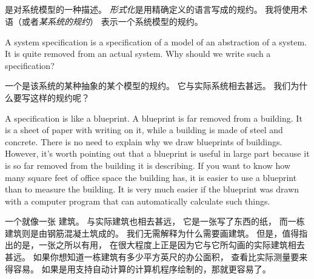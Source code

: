 \begin{ch}
  \vspace{-\baselineskip}
  \subsection{\tlaspec}    

  \emph{\tlaspec}是对系统模型的一种描述。
  \emph{形式化}\tlaspec{}是用精确定义的语言写成的规约。
  我将使用术语\emph{\tlasystemspec}（或者\emph{某系统的规约}）
  表示一个系统模型的规约。
\end{ch}

\begin{en}
A system specification is a specification of a model of an abstraction
of a system.  It is quite removed from an actual system.  Why should
we write such a specification?
\end{en}

\begin{ch}
  一个\tlasystemspec{}是该系统的某种抽象的某个模型的规约。
  它与实际系统相去甚远。
  我们为什么要写这样的规约呢？
\end{ch}

\begin{en}
A specification is like a 
blueprint.  A blueprint is far removed from a building.  It is a sheet
of paper with writing on it, while a building is made of steel and
concrete.  There is no need to explain why we draw blueprints of
buildings.  However, it's worth pointing out that a blueprint is
useful in large part because it is so far removed from the building it
is describing.  If you want to know how many square feet of office
space the building has, it is easier to use a blueprint than to
measure the building.  It is very much easier if the blueprint was
drawn with a computer program that can automatically calculate such
things.
\end{en}

\begin{ch}
  一个\tlaspec{}就像一张%
  建筑\blueprint{}。
  \blueprint{}与实际建筑也相去甚远，
  它是一张写了东西的纸，
  而一栋建筑则是由钢筋混凝土筑成的。
  我们无需解释为什么需要画建筑\blueprint{}。
  但是，值得指出的是，一张\blueprint{}之所以有用，
  在很大程度上正是因为它与它所勾画的实际建筑相去甚远。
  如果你想知道一栋建筑有多少平方英尺的办公面积，
  查看\blueprint{}比实际测量要来得容易。
  如果\blueprint{}是用支持自动计算的计算机程序绘制的，那就更容易了。
\end{ch}

